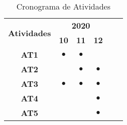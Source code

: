 \begin{table}[h!]
    \centering
    \footnotesize
    \def \arraystretch{1.0}
    \caption{Cronograma de Atividades}
    \begin{tabular}{|c|c|c|c|c|c|}
        \hline
        \multirow{2}{*}{\bf Atividades} &  \multicolumn{3}{c|}{\bf 2020} \\ \cline{2-4} 
        & \bf 10 & \bf 11 & \bf 12\\  
        \hline
        \bf AT1 & $\bullet$ & $\bullet$ & \\
        \hline
        \bf AT2 &  & $\bullet$ &$\bullet$\\
        \hline
        \bf AT3 & $\bullet$ & $\bullet$ & $\bullet$ \\
        \hline
        \bf AT4 &  &  & $\bullet$ \\
        \hline
        \bf AT5 & & & $\bullet$ \\
        \hline
    \end{tabular}
    \label{tabela_cronograma}
\end{table}